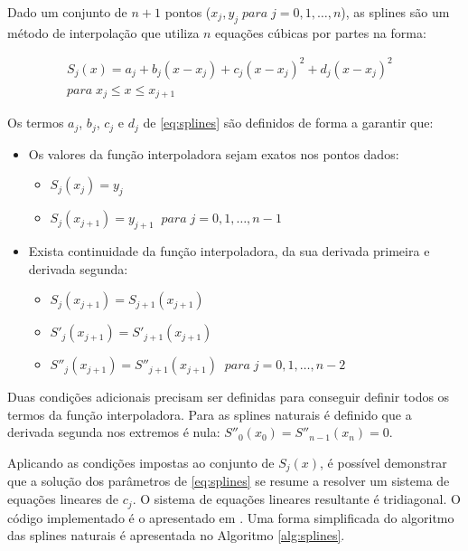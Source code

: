 \documentclass[final,5p]{elsarticle}
\numberwithin{equation}{section}
\begin{document}
        Dado um conjunto de $n+1$ pontos ($x_j,y_j \; para \; j=0,1,\ldots,n$), as splines são um método de interpolação que utiliza $n$ equações cúbicas por partes na forma:
        
        \begin{align}
            S_j(x) = a_j + b_j (x-x_j) + c_j (x-x_j)^2 + d_j (x-x_j)^2& \nonumber \\
            para \; x_j \le x \le x_{j+1}& \label{eq:splines}
        \end{align}
        
        Os termos $a_j$, $b_j$, $c_j$ e $d_j$ de \ref{eq:splines} são definidos de forma a garantir que:
        
        \begin{itemize}
            \item Os valores da função interpoladora sejam exatos nos pontos dados:
            \begin{itemize}
                \item $S_j(x_j)=y_j$
                \item $S_j(x_{j+1})=y_{j+1} \; \; para \; j=0,1,\ldots,n-1$ 
            \end{itemize} 
            \item Exista continuidade da função interpoladora, da sua derivada primeira e derivada segunda:
            \begin{itemize}
                \item $S_j(x_{j+1})=S_{j+1}(x_{j+1})$
                \item $S'_j(x_{j+1})=S'_{j+1}(x_{j+1})$
                \item $S''_j(x_{j+1})=S''_{j+1}(x_{j+1}) \; \; para \; j=0,1,\ldots,n-2$ 
            \end{itemize} 
        \end{itemize}
        Duas condições adicionais precisam ser definidas para conseguir definir todos os termos da função interpoladora. Para as splines naturais é definido que a derivada segunda nos extremos é nula: $S''_0(x_0) = S''_{n-1}(x_n) = 0$.
        
        Aplicando as condições impostas ao conjunto de $S_j(x)$, é possível demonstrar que  a solução dos parâmetros de \ref{eq:splines} se resume a resolver um sistema de equações lineares de $c_j$. O sistema de equações lineares resultante é tridiagonal. O código implementado é o apresentado em \cite{burden2016analise}. Uma forma simplificada do algoritmo das splines naturais é apresentada no Algoritmo \ref{alg:splines}. 
\end{document}
